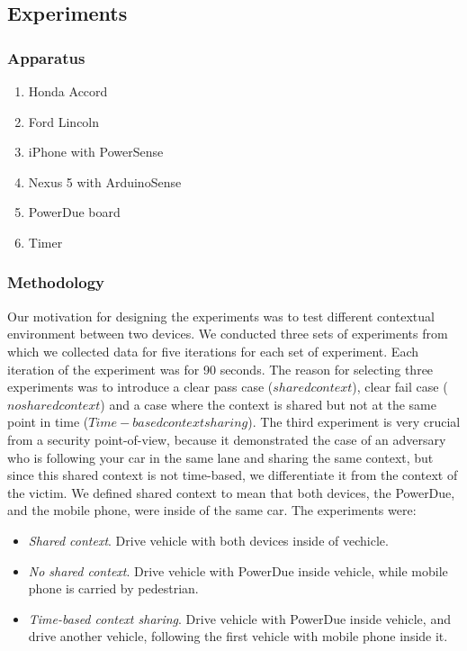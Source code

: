\documentclass[journal]{IEEEtranTIE}
\begin{document}
\subsection{Experiments}

\subsubsection{Apparatus}

\begin{enumerate}
\item Honda Accord
\item Ford Lincoln
\item iPhone with PowerSense
\item Nexus 5 with ArduinoSense
\item PowerDue board
\item Timer
\end{enumerate}

\subsubsection{Methodology}

Our motivation for designing the experiments was to test different contextual
environment between two devices. We conducted three sets of experiments from
which we collected data for five iterations for each set of experiment. Each
iteration of the experiment was for 90 seconds. The reason for selecting three
experiments was to introduce a clear pass case ($shared context$), clear fail
case ($no shared context$) and a case where the context is shared but not at the
same point in time ($Time-based context sharing$). The third experiment is very
crucial from a security point-of-view, because it demonstrated the case of an
adversary who is following your car in the same lane and sharing the same
context, but since this shared context is not time-based, we differentiate it
from the context of the victim. We defined shared context to mean that both
devices, the PowerDue, and the mobile phone, were inside of the same car. The
experiments were:

\begin{itemize}
\item \textit{Shared context}. Drive vehicle with both devices inside of
      vechicle.
\item \textit{No shared context}. Drive vehicle with PowerDue inside vehicle,
      while mobile phone is carried by pedestrian.
\item \textit{Time-based context sharing}. Drive vehicle with PowerDue inside
      vehicle, and drive another vehicle, following the first vehicle with
      mobile phone inside it.
\end{itemize}
\end{document}

